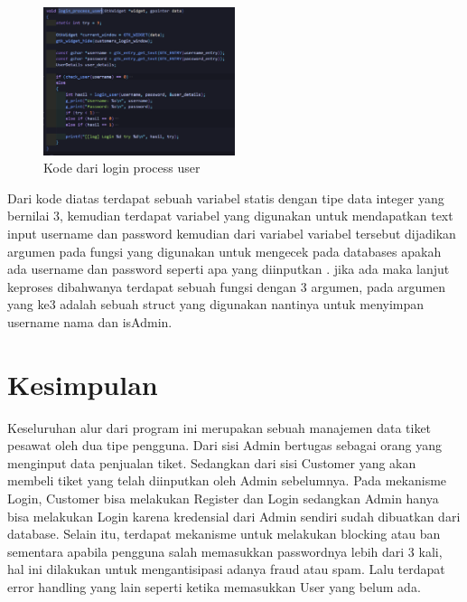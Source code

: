 \documentclass[a4paper,12pt]{article}
\begin{document}
\begin{figure}[!htbp]
    \centering
    \includegraphics[width=0.5\textwidth]{./img/login_process_user.png}
    \caption{Kode dari login process user}
\end{figure}
\FloatBarrier
Dari kode diatas terdapat sebuah variabel statis dengan tipe data integer yang bernilai 3, kemudian terdapat variabel yang digunakan untuk mendapatkan text input username dan password
kemudian dari variabel variabel tersebut dijadikan argumen pada fungsi \texttt{} yang digunakan untuk mengecek pada databases apakah ada username dan password seperti apa yang diinputkan .
jika ada maka lanjut keproses dibahwanya terdapat sebuah fungsi \texttt{} dengan 3 argumen, pada argumen yang ke3 adalah sebuah struct yang digunakan nantinya untuk menyimpan username nama dan isAdmin.

\section{Kesimpulan}
Keseluruhan alur dari program ini merupakan sebuah manajemen data tiket pesawat oleh dua tipe pengguna.
Dari sisi Admin bertugas sebagai orang yang menginput data penjualan tiket. Sedangkan dari sisi Customer yang akan membeli tiket yang telah diinputkan oleh Admin sebelumnya.
Pada mekanisme Login, Customer bisa melakukan Register dan Login sedangkan Admin hanya bisa melakukan Login karena kredensial dari Admin sendiri sudah dibuatkan dari database. Selain itu, terdapat mekanisme untuk melakukan blocking atau ban
sementara apabila pengguna salah memasukkan passwordnya lebih dari 3 kali, hal ini dilakukan untuk mengantisipasi adanya fraud atau spam. Lalu terdapat error handling yang lain seperti ketika memasukkan User yang belum ada.
\end{document}
